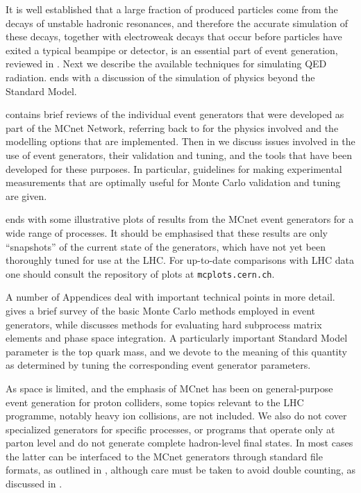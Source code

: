 It is well established that a large fraction of produced particles
come from the decays of unstable hadronic resonances, and therefore the
accurate simulation of these decays, together with electroweak decays
that occur before particles have exited a typical beampipe or detector, is an essential
part of event generation, reviewed in .  Next we
describe the available techniques for simulating QED
radiation.  ends with a discussion of
the simulation of physics beyond the Standard Model.

 contains brief reviews of the individual
event generators that were developed as part of the MCnet Network,
referring back to  for the physics
involved and the modelling options that are implemented.  Then
in  we discuss issues involved in the use
of event generators, their validation and tuning, and the tools that
have been developed for these purposes. In particular, guidelines for
making experimental measurements that are optimally useful for Monte
Carlo validation and tuning are given.

 ends with some illustrative plots of
results from the MCnet event generators for a wide range of processes.  It
should be emphasised that these results are only ``snapshots'' of the
current state of the generators, which have not yet been thoroughly
tuned for use at the LHC.  For up-to-date comparisons with LHC data
one should consult the repository of plots at {\tt mcplots.cern.ch}.

A number of Appendices deal with important technical points in more
detail.   gives a brief survey of the basic
Monte Carlo methods employed in event generators, while
 discusses methods for evaluating hard subprocess
matrix elements and phase space integration.
A particularly important Standard Model parameter is the top quark mass, and
we devote  to the meaning of this quantity as determined
by tuning the corresponding event generator parameters.

  As space is limited, and the emphasis of MCnet has been on
  general-purpose event generation for proton colliders, some topics
  relevant to the LHC programme, notably  heavy ion collisions, are
  not included.  We also do not cover specialized generators for
  specific processes, or programs that operate only at parton level
  and do not generate complete hadron-level final states. In
  most cases the latter can be interfaced to the MCnet generators
  through standard file formats,  as outlined in
  ,  although care must be taken to avoid
  double counting, as discussed in .

